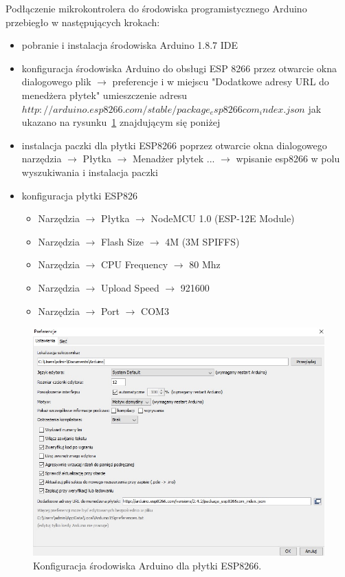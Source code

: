 \documentclass[12p]{article}
\begin{document}
Podłączenie mikrokontrolera do środowiska programistycznego Arduino przebiegło w następujących krokach:
\begin{itemize}
\item pobranie i instalacja środowiska Arduino 1.8.7 IDE
\item konfiguracja środowiska Arduino do obsługi ESP 8266 przez otwarcie okna dialogowego plik $\rightarrow$ preferencje i w miejscu "Dodatkowe adresy URL do menedżera płytek" umieszczenie adresu $http://arduino.esp8266.com/stable/package_esp8266com_index.json$ jak ukazano na rysunku~\ref{konf_arduino} znajdującym się poniżej
\item instalacja paczki dla płytki ESP8266 poprzez otwarcie okna dialogowego narzędzia $\rightarrow$ Płytka $\rightarrow$ Menadżer płytek ... $\rightarrow$ wpisanie esp8266 w polu wyszukiwania i instalacja paczki
\item konfiguracja płytki ESP826
\begin{itemize}
\item Narzędzia $\rightarrow$ Płytka $\rightarrow$ NodeMCU 1.0 (ESP-12E Module)
\item Narzędzia $\rightarrow$ Flash Size $\rightarrow$ 4M (3M SPIFFS)
\item Narzędzia $\rightarrow$ CPU Frequency $\rightarrow$ 80 Mhz
\item Narzędzia $\rightarrow$ Upload Speed $\rightarrow$ 921600
\item Narzędzia $\rightarrow$ Port $\rightarrow$ COM3
\end{itemize} 
\end{itemize}




\begin{figure}[H]
\centering
\includegraphics[width=12cm]{ustawienie_esp8266.jpg}
\caption{Konfiguracja środowiska Arduino dla płytki ESP8266.}\label{konf_arduino}
\end{figure}
\end{document}
